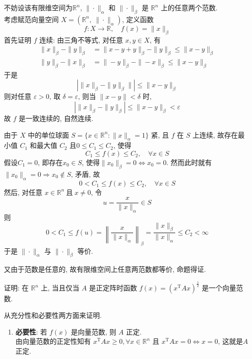 \documentclass[12pt, answers]{exam}     %
\newcommand{\R}{\mathbb{R}}
\newcommand{\T}{\mathrm{T}}
\begin{document}
\begin{questions}
\begin{solution}
不妨设该有限维空间为$\R^n$, $\| \cdot \|_\alpha$ 和 $\| \cdot \|_\beta$ 是 $\R^n$ 上的任意两个范数. \\
考虑赋范向量空间 $X = (\mathbb{R}^n,\ \| \cdot \|_\alpha)$, 定义函数
\[
f : X \to \mathbb{R}, \quad f(x) = \|x\|_\beta
\]
首先证明 $f$ 连续: 由三角不等式, 对任意 $x, y \in X$, 有
\begin{align*}
\|x\|_{\beta} - \|y\|_{\beta} &= \|x - y + y\|_{\beta} - \|y\|_{\beta} \leq \|x - y\|_{\beta} \\
\|y\|_{\beta} - \|x\|_{\beta} &= \|-y\|_{\beta} - \|-x\|_{\beta} \leq \|x - y\|_{\beta}
\end{align*}
于是
\[
\left| \|x\|_{\beta} - \|y\|_{\beta} \|\right| \leq \|x - y\|_{\beta}       
\]
则对任意 $\varepsilon > 0$, 取 $\delta = \varepsilon$, 则当 $\|x - y\| < \delta$ 时, 
\[
\left| \|x\|_{\beta} - \|y\|_{\beta} \right| \leq \|x - y\|_{\beta} < \varepsilon
\]
故 $f$ 是一致连续的, 自然连续.

由于 $X$ 中的单位球面 $S = \{ x \in \mathbb{R}^n : \|x\|_\alpha = 1 \}$ 紧, 且 $f$ 在 $S$ 上连续, 故存在最小值 $C_1$ 和最大值 $C_2$ 且$0 \leq C_1 \leq C_2$, 使得
\[
C_1 \leq f(x) \leq C_2, \quad \forall x \in S
\]
假设$C_1 = 0$, 即存在$ x_0 \in S $, 使得$\| x_0 \|_{\beta} = 0 \Leftrightarrow x_0 = 0 $. 然而此时就有$\|x_0\|_{\alpha} = 0 \Rightarrow x_0 \notin S$, 矛盾, 故
\[
0 < C_1 \leq f(x) \leq C_2, \quad \forall x \in S
\]
然后, 对任意 $x \in \mathbb{R}^n\ \text{且}\ x \neq 0$, 令
\[
u = \frac{x}{\|x\|_\alpha} \in S
\]
则
\[
0 < C_1 \leq f(u) = \left\| \frac{x}{\|x\|_\alpha} \right\|_\beta =  \frac{\|x\|_{\beta}}{\|x\|_\alpha} \leq C_2 < \infty
\]
于是 $\| \cdot \|_\alpha$ 与 $\| \cdot \|_\beta$ 等价. 

又由于范数是任意的, 故有限维空间上任意两范数都等价, 命题得证.
\end{solution}

\question{}
证明: 在 \( \R^n \) 上, 当且仅当 \( A \) 是正定阵时函数 \( f(x) = (x^{\T}Ax)^{\frac{1}{2}} \) 是一个向量范数. 

\begin{solution}
从充分性和必要性两方面来证明.
\begin{enumerate}
    \item \textbf{必要性}: 若 \( f(x) \) 是向量范数, 则 \( A \) 正定. \\
    由向量范数的正定性知有 \( x^{\T}Ax \geq 0, \forall x \in \R^n \) 且 \( x^{\T}Ax = 0 \Leftrightarrow x = 0 \),
    这就是\( A \) 正定. 


\end{enumerate}
\end{solution}
\end{questions}
\end{document}
